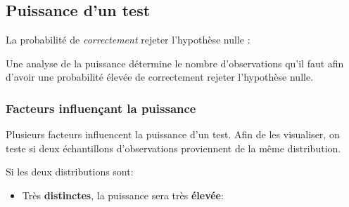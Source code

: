 \documentclass[10pt, french]{article}
\begin{document}
\begin{multicols*}{2}
\begin{center}
\end{center}



\columnbreak
\subsection{Puissance d'un test}\label{subsec:PowerTests}
\begin{definitionNOHFILL}
La probabilité de \textit{correctement} rejeter l'hypothèse nulle : 

\tcbline

Une analyse de la puissance détermine le nombre d'observations qu'il faut afin d'avoir une probabilité élevée de correctement rejeter l'hypothèse nulle.
\end{definitionNOHFILL}

\subsubsection{Facteurs influençant la puissance}
Plusieurs facteurs influencent la puissance d'un test. Afin de les visualiser, on teste si deux échantillons d'observations proviennent de la même distribution. 

\begin{definitionNOHFILLsub}
Si les deux distributions sont:
\begin{itemize}
	\item	Très \textbf{distinctes}, la puissance sera très \textbf{élevée}:
		\begin{center}


\end{center}
\end{itemize}
\end{definitionNOHFILLsub}
\end{multicols*}
\end{document}
